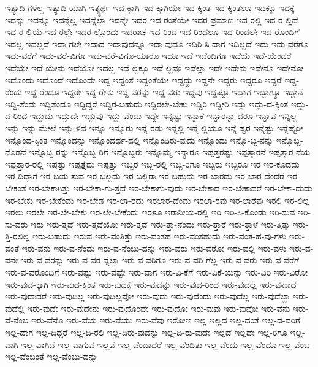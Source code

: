 {ಇತ್ಯಾದಿ-ಗಳೆಲ್ಲ
ಇತ್ಯಾದಿ-ಯಾಗಿ
ಇತ್ಯ್ಧರ್ಥ
ಇದ-ಕ್ಕಾಗಿ
ಇದ-ಕ್ಕಾಗಿಯೇ
ಇದ-ಕ್ಕಿಂತ
ಇದ-ಕ್ಕಿಂತಲೂ
ಇದಕ್ಕೂ
ಇದಕ್ಕೆ
ಇದನ್ನು
ಇದನ್ನೂ
ಇದನ್ನೆಲ್ಲ
ಇದನ್ನೆಲ್ಲಾ
ಇದನ್ನೇ
ಇದರ
ಇದ-ರಂತೆಯೇ
ಇದರ-ಪ್ರಮಾಣ
ಇದ-ರಲ್ಲಿ
ಇದ-ರ-ಲ್ಲಿದೆ
ಇದ-ರ-ಲ್ಲಿಯೆ
ಇದ-ರಲ್ಲೇ
ಇದರ-ಲ್ಲೊಂದು
ಇದರಾಚೆ
ಇದ-ರಿಂದ
ಇದ-ರಿಂದಲೂ
ಇದ-ರಿಂದಲೇ
ಇದ-ರೊಂದಿಗೆ
ಇದಲ್ಲ
ಇದಲ್ಲದೆ
ಇದಾ-ಗಲೇ
ಇದಾದ
ಇದಾವುದನ್ನೂ
ಇದಾ-ವುದೂ
ಇದಿರಿ-ಸಿ-ದಾಗ
ಇದಿಲ್ಲದೆ
ಇದು
ಇದು-ವರೆಗೂ
ಇದು-ವರೆಗೆ
ಇದು-ವರೆ-ವಿಗೂ
ಇದು-ವರೆ-ವಿಗೂ-ಯಾರೂ
ಇದೂ
ಇದೆ
ಇದೆಂದಿಗೂ
ಇದೆಯೆ
ಇದೆ-ಯೆಂದರೆ
ಇದೆಯೇ
ಇದೆ-ಯೇನು
ಇದೆಯೋ
ಇದೆಲ್ಲ
ಇದೆ-ಲ್ಲಕ್ಕೂ
ಇದೆ-ಲ್ಲವೂ
ಇದೆಲ್ಲಾ
ಇದೇ
ಇದೇನು
ಇದೇನೂ
ಇದೇನೋ
ಇದೊಂದು
ಇದೊಂದೆ
ಇದೊಂದೇ
ಇದ್ದ
ಇದ್ದಂತೆ
ಇದ್ದಂತೆಯೇ
ಇದ್ದದ್ದು
ಇದ್ದನೇ
ಇದ್ದರು
ಇದ್ದರೂ
ಇದ್ದರೆ
ಇದ್ದ-ರೆಂದು
ಇದ್ದ-ರೆಂದೂ
ಇದ್ದರೇ
ಇದ್ದ-ರೇನು
ಇದ್ದ-ವರನ್ನು
ಇದ್ದ-ವರು
ಇದ್ದವು
ಇದ್ದಷ್ಟೂ
ಇದ್ದಾಗ
ಇದ್ದಾಗ್ಯೂ
ಇದ್ದಾನೆ
ಇದ್ದಿ-ತೆಂದು
ಇದ್ದಿತೆಂದೂ
ಇದ್ದಿದ್ದರೆ
ಇದ್ದಿರ-ಬಹುದು
ಇದ್ದಿರಲೇ-ಬೇಕು
ಇದ್ದಿರಿ
ಇದ್ದೀರಿ
ಇದ್ದು
ಇದ್ದು-ದ-ಕ್ಕಿಂತ
ಇದ್ದು-ದ-ರಿಂದ
ಇದ್ದುದು
ಇದ್ದುದೇ
ಇದ್ದುವು
ಇದ್ದು-ವೆಂದು
ಇದ್ದೇ
ಇನ್ನಷ್ಟು
ಇನ್ನಾಕೆ
ಇನ್ನಾರನ್ನಾ-ದರೂ
ಇನ್ನಾವ
ಇನ್ನಿಲ್ಲ
ಇನ್ನು
ಇನ್ನು-ಮೇಲೆ
ಇನ್ನು-ಳಿದ
ಇನ್ನೂ
ಇನ್ನೂರು
ಇನ್ನೆ-ರಡು
ಇನ್ನೆಲ್ಲಿ
ಇನ್ನೆ-ಲ್ಲಿಯೂ
ಇನ್ನೆ-ಷ್ಟರ
ಇನ್ನೆಷ್ಟು
ಇನ್ನೆಷ್ಟೋ
ಇನ್ನೊಂದ-ಕ್ಕಿಂತ
ಇನ್ನೊಂದನ್ನು
ಇನ್ನೊಂದರ್ಥ-ದಲ್ಲಿ
ಇನ್ನೊಂದಿರು-ವುದು
ಇನ್ನೊಂದು
ಇನ್ನೊ-ಬ್ಬ-ನನ್ನು
ಇನ್ನೊಬ್ಬ-ನೊಡನೆ
ಇನ್ನೊಬ್ಬ-ರನ್ನು
ಇನ್ನೊಬ್ಬ-ರಿಗೆ
ಇನ್ನೊಬ್ಬರು
ಇನ್ನೊಮ್ಮೆ
ಇನ್ಯಾರೂ
ಇಪ್ಪತ್ತರಷ್ಟು
ಇಪ್ಪತ್ತಾರನೆ
ಇಪ್ಪತ್ತಾರ-ನೆಯ
ಇಪ್ಪತ್ತಾರ-ರಲ್ಲಿ
ಇಪ್ಪತ್ತು
ಇಪ್ಪತ್ತೈದು
ಇಪ್ಪತ್ತ್ತು
ಇಬ್ಬರ
ಇಬ್ಬ-ರಲ್ಲಿ
ಇಬ್ಬ-ರಿಗೂ
ಇಬ್ಬರು
ಇಬ್ಬರೂ
ಇರ
ಇರ-ಕೂಡದು
ಇರ-ದಿದ್ದಾಗ
ಇರ-ಬಯ-ಸುವ
ಇರ-ಬಲ್ಲದು
ಇರ-ಬಲ್ಲಿರಾ
ಇರ-ಬಹುದು
ಇರ-ಬಾರದು
ಇರ-ಬಾರ-ದೆಂದರೆ
ಇರ-ಬೇಕಂತೆ
ಇರ-ಬೇಕಾಗಿತ್ತು
ಇರ-ಬೇಕಾ-ಗು-ತ್ತದೆ
ಇರ-ಬೇಕಾಗು-ವುದು
ಇರ-ಬೇಕಾದ
ಇರ-ಬೇಕಾದರೆ
ಇರ-ಬೇಕಾ-ದುದು
ಇರ-ಬೇಕು
ಇರ-ಬೇಕೆಂದು
ಇರ-ಬೇಡ
ಇರ-ಲಾ-ರದು
ಇರಲಾರ-ದೆಂದು
ಇರಲಾ-ರವು
ಇರ-ಲಾರೆವು
ಇರಲಿ
ಇರ-ಲಿಲ್ಲ
ಇರಲು
ಇರಲೇ
ಇರ-ಲೇ-ಬೇಕು
ಇರ-ಲೇ-ಬೇಕೆಂದು
ಇರಳೂ
ಇರಾನೀಯ-ರಲ್ಲಿ
ಇರಿ
ಇರಿ-ಸಿ-ಕೊಂಡು
ಇರಿ-ಸುವ
ಇರಿ-ಸು-ವರು
ಇರು
ಇರು-ತ್ತದೆ
ಇರು-ತ್ತದೆಯೋ
ಇರು-ತ್ತವೆ
ಇರು-ತ್ತಾ-ನೆಂದು
ಇರು-ತ್ತಾರೆ
ಇರು-ತ್ತಾಳೆ
ಇರು-ತ್ತಿತ್ತು
ಇರು-ತ್ತಿ-ರಲಿಲ್ಲ
ಇರು-ಬಹುದು
ಇರುವ
ಇರು-ವಂತಿತ್ತು
ಇರು-ವಂತಹ
ಇರು-ವಂತಹುದು
ಇರು-ವಂತ-ಹ-ವು-ಗಳು
ಇರು-ವಂತೆ
ಇರು-ವನು
ಇರು-ವ-ನೆಂದು
ಇರು-ವ-ನೆಂಬು-ದನ್ನು
ಇರು-ವರು
ಇರು-ವರೋ
ಇರು-ವಲ್ಲಿ
ಇರು-ವಳು
ಇರು-ವ-ವನೇ
ಇರು-ವ-ವರನ್ನು
ಇರು-ವ-ವರ-ನ್ನೆಲ್ಲಾ
ಇರು-ವ-ವರಿಗೂ
ಇರು-ವ-ವರಿ-ಗೆಲ್ಲ
ಇರು-ವ-ವರು
ಇರು-ವ-ವರೆಗೆ
ಇರು-ವ-ವರೊಂದಿಗೆ
ಇರು-ವಷ್ಟು
ಇರು-ವಷ್ಟೇ
ಇರು-ವಾಗ
ಇರು-ವಿ-ಕೆಗೆ
ಇರು-ವಿಕೆ-ಯನ್ನು
ಇರು-ವಿರಿ
ಇರು-ವಿರೋ
ಇರು-ವುದ-ಕ್ಕಾಗಿ
ಇರು-ವುದ-ಕ್ಕಿಂತ
ಇರು-ವುದಕ್ಕೆ
ಇರು-ವುದನ್ನು
ಇರು-ವುದ-ರಿಂದ
ಇರು-ವುದಲ್ಲ
ಇರು-ವುದಾದ
ಇರು-ವುದಾದರೆ
ಇರು-ವುದಿಲ್ಲ
ಇರು-ವುದಿಲ್ಲವೋ
ಇರು-ವುದು
ಇರು-ವುದೆಂದು
ಇರು-ವುದೆಲ್ಲ
ಇರು-ವುದೆಲ್ಲಾ
ಇರು-ವುದೆಲ್ಲಿ
ಇರು-ವುದೇ
ಇರು-ವುದೇನು
ಇರು-ವುದೊಂದೇ
ಇರು-ವುದೋ
ಇರು-ವುವು
ಇರು-ವುವೋ
ಇರು-ವೆನು
ಇರು-ವೆ-ನೆಂಬ
ಇರು-ವೆನೊ
ಇರು-ವೆಯ
ಇರು-ವೆಯು
ಇರು-ವೆವು
ಇರೋಣ
ಇಲ್ಲ
ಇಲ್ಲದ
ಇಲ್ಲ-ದಂತೆ
ಇಲ್ಲ-ದ-ವರಿಗೆ
ಇಲ್ಲ-ದಾಗ
ಇಲ್ಲ-ದಿದ್ದರೆ
ಇಲ್ಲ-ದಿ-ರಲಿ
ಇಲ್ಲ-ದಿರು-ವುದನ್ನು
ಇಲ್ಲ-ದಿ-ರು-ವುದೇ
ಇಲ್ಲದೆ
ಇಲ್ಲದೇ
ಇಲ್ಲ-ರಿಗೂ
ಇಲ್ಲ-ವಾಗಿ
ಇಲ್ಲ-ವಾಗಿದೆ
ಇಲ್ಲ-ವಾಗುವ
ಇಲ್ಲವೆ
ಇಲ್ಲ-ವೆಂದಾದರೆ
ಇಲ್ಲ-ವೆಂದಿತು
ಇಲ್ಲ-ವೆಂದು
ಇಲ್ಲ-ವೆಂದೂ
ಇಲ್ಲ-ವೆಂಬ
ಇಲ್ಲ-ವೆಂಬಂತೆ
ಇಲ್ಲ-ವೆಂಬು-ದನ್ನು
}
